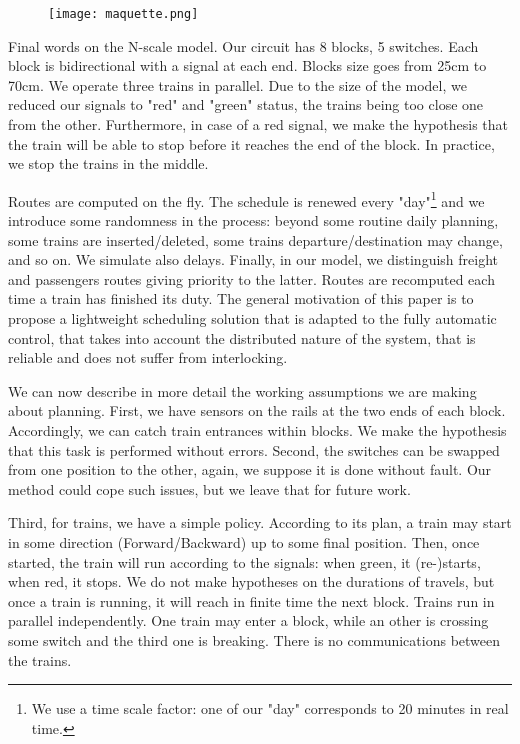 \documentclass[runningheads]{llncs}
\begin{document}
\begin{figure}
 \begin{minipage}{0.28\textwidth}
        \centering
        \vspace{-8mm}
\texttt{[image: maquette.png]}
    \end{minipage}
\end{figure}

Final words on the N-scale model. Our circuit has 8 blocks, 5 switches. Each block is bidirectional with a signal at each end. Blocks size goes from 25cm to 70cm.  We operate  three trains in parallel. Due to the size of the model, we reduced our signals  to "red" and "green" status, the trains being too close one from the other. Furthermore, in case of a red signal, we make the hypothesis that the train will be able to stop before it reaches the end of the block. In practice, we stop the trains in the middle. 

Routes are computed on the fly. The schedule is renewed every "day"\footnote{We use a time scale factor: one of our "day" corresponds to 20 minutes in real time.}  and we introduce some randomness in the process: beyond some routine daily planning, some trains are inserted/deleted, some trains departure/destination may change, and so on. We simulate also delays. Finally, in our model, we distinguish freight and  passengers routes giving priority to the latter. Routes are recomputed each time a train has finished its duty. The general motivation of this paper is to propose a lightweight scheduling solution that is adapted to the fully automatic control, that takes into account the distributed nature of the system, that is reliable and does not suffer from interlocking.  
 
We can now describe in more detail the working assumptions we are making about planning.  First, we have sensors on the rails at the two ends of each block. Accordingly,  we can catch train entrances within blocks. We make the hypothesis that this task is performed without errors. Second, the switches can be swapped from one position to the other, again, we suppose it is done without fault. Our method could cope such issues, but we leave that for future work. 
 
  Third, for trains, we have a simple policy.  According to its plan, a train may start in some direction (Forward/Backward) up to some final position. Then, once started, the train will run according to the signals: when green, it (re-)starts, when red, it stops.  We do not make hypotheses on the durations of travels, but once a train is running, it will reach in finite time the next block. Trains run in parallel independently. One train may enter a block, while an other is crossing some switch and the third one is breaking. There is no communications between the trains.
\end{document}
